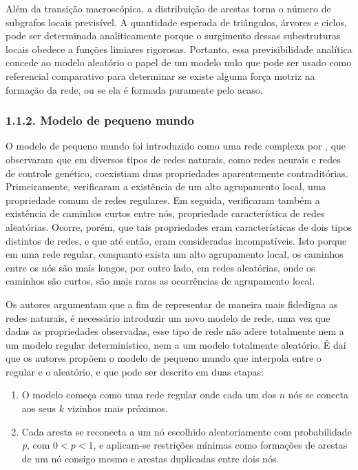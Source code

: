 \documentclass[12pt,oneside,a4paper,brazil,sumario=tradicional]{abntex2}
\begin{document}
Além da transição macroscópica, a distribuição de arestas torna o número de subgrafos locais previsível. A quantidade esperada de triângulos, árvores e ciclos, pode ser  determinada analiticamente porque o surgimento dessas subestruturas locais obedece a funções limiares rigorosas. Portanto, essa previsibilidade analítica concede ao modelo aleatório o papel de um modelo nulo que pode ser usado como referencial comparativo para determinar se existe alguma força motriz na formação da rede, ou se ela é formada puramente pelo acaso.

\subsubsection*{1.1.2. Modelo de pequeno mundo}
O modelo de pequeno mundo foi introduzido como uma rede complexa por \textcite{watts1998}, que observaram que em diversos tipos de redes naturais, como redes neurais e redes de controle genético, coexistiam duas propriedades aparentemente contraditórias. Primeiramente, verificaram a existência de um alto agrupamento local, uma propriedade comum de redes regulares. Em seguida, verificaram também a existência de caminhos curtos entre nós, propriedade característica de redes aleatórias. Ocorre, porém, que tais propriedades eram características de dois tipos distintos de redes, e que até então, eram consideradas incompatíveis. Isto porque em uma rede regular, conquanto exista um alto agrupamento local, os caminhos entre os nós são mais longos, por outro lado, em redes aleatórias, onde os caminhos são curtos, são mais raras as ocorrências de agrupamento local.

Os autores argumentam que a fim de representar de maneira mais fidedigna as redes naturais, é necessário introduzir um novo modelo de rede, uma vez que dadas as propriedades observadas, esse tipo de rede não adere totalmente nem a um modelo regular determinístico, nem a um modelo totalmente aleatório. É daí que os autores propõem o modelo de pequeno mundo que interpola entre o regular e o aleatório, e que pode ser descrito em duas etapas:

\begin{enumerate}
  \item O modelo começa como uma rede regular onde cada um dos $n$ nós se conecta aos seus $k$ vizinhos mais próximos.
  \item Cada aresta se reconecta a um nó escolhido aleatoriamente com probabilidade \textit{p}, com $0 < p < 1$, e aplicam-se restrições mínimas como formações de arestas de um nó consigo mesmo e arestas duplicadas entre dois nós.
\end{enumerate}
\end{document}
